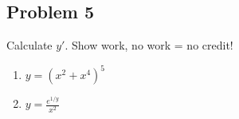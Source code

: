 \documentclass[10pt]{book}
\theoremstyle{definition}
\begin{document}
\subsection*{Problem 5} Calculate $y'$. Show work, no work = no credit!
\begin{enumerate}[label=(\alph*)]
    \item $\displaystyle y=(x^2+x^4)^5$\vspace{3cm}
    \item $\displaystyle y=\frac{e^{1/y}}{x^2}$\vspace{3cm}
\end{enumerate}
\end{document}
